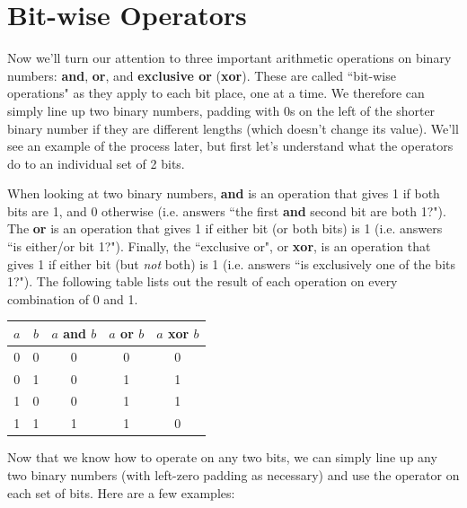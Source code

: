 
\section{Bit-wise Operators}

Now we’ll turn our attention to three important arithmetic operations on binary numbers:
\textbf{and}, \textbf{or}, and \textbf{exclusive or} (\textbf{xor}). These are
called ``bit-wise operations" as they apply to each bit place, one at a time. We therefore can simply line up two binary numbers, padding with 0s on the left of the shorter binary number if they are different lengths (which doesn't change its value). We'll see an example of the process later, but first let's understand what the operators do to an individual set of 2 bits.  

When looking at two binary numbers, \textbf{and} is an operation that gives 1 if both bits are 1, and 0 otherwise (i.e. answers ``the first \textbf{and} second bit are both 1?"). The \textbf{or} is an operation that gives 1 if either bit (or both bits) is 1 (i.e. answers ``is either/or bit 1?"). Finally, the ``exclusive or", or \textbf{xor}, is an operation that gives 1 if either bit (but \textit{not} both) is 1 (i.e. answers ``is exclusively one of the bits 1?"). The following table lists out the result of each operation on every combination of 0 and 1. 

\begin{center}
\begin{tabular}{|c|c|c|c|c|}
\hline
$a$ & $b$ & $a$ \textbf{and} $b$ & $a$ \textbf{or} $b$ & $a$ \textbf{xor} $b$ \\
\hline
0   &  0  &  0  &  0  &  0  \\ 
0   &  1  &  0  &  1  &  1  \\
1   &  0  &  0  &  1  &  1  \\
1   &  1  &  1  &  1  &  0  \\
\hline
\end{tabular}
\end{center}

Now that we know how to operate on any two bits, we can simply line up any two binary numbers (with left-zero padding as necessary) and use the operator on each set of bits. Here are a few examples: 

